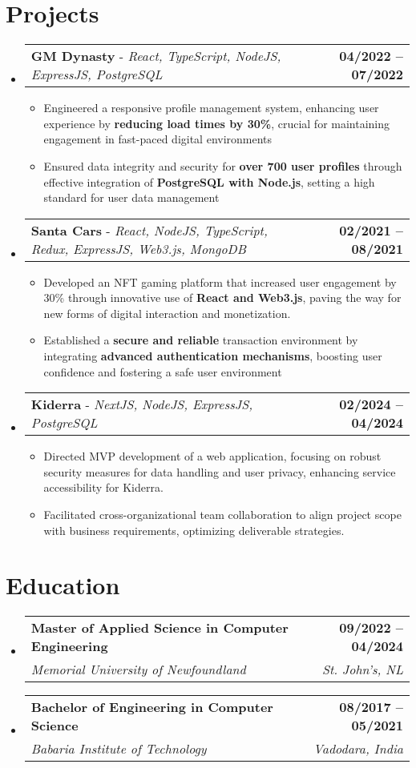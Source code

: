 \documentclass[letterpaper,11pt]{article}
\makeatletter
\newcommand{\resumeItem}[1]{
  \item\small{
    {#1 \vspace{-2pt}}
  }
}
\newcommand{\resumeSubheading}[4]{
  \vspace{-2pt}\item
    \begin{tabular*}{1.0\textwidth}[t]{l@{\extracolsep{\fill}}r}
      \textbf{#1} & \textbf{\small #2} \\
      \textit{\small#3} & \textit{\small #4} \\
    \end{tabular*}\vspace{-7pt}
}
\newcommand{\resumeProjectHeading}[2]{
    \item
    \begin{tabular*}{1.001\textwidth}{l@{\extracolsep{\fill}}r}
      \small#1 & \textbf{\small #2}\\
    \end{tabular*}\vspace{-7pt}
}
\newcommand{\resumeSubHeadingListStart}{\begin{itemize}[leftmargin=0.0in, label={}]}
\newcommand{\resumeSubHeadingListEnd}{\end{itemize}}
\newcommand{\resumeItemListStart}{\begin{itemize}}
\newcommand{\resumeItemListEnd}{\end{itemize}\vspace{-5pt}}
\makeatother
\begin{document}
\section{Projects}
  \resumeSubHeadingListStart
    \resumeProjectHeading
        {\textbf{GM Dynasty} - \emph{React, TypeScript, NodeJS, ExpressJS, PostgreSQL}}{04/2022 -- 07/2022}
        \resumeItemListStart
          \resumeItem{Engineered a responsive profile management system, enhancing user experience by \textbf{reducing load times by 30\%}, crucial for maintaining engagement in fast-paced digital environments}
          \resumeItem{Ensured data integrity and security for \textbf{over 700 user profiles} through effective integration of \textbf{PostgreSQL with Node.js}, setting a high standard for user data management}
        \resumeItemListEnd
        \vspace{-16pt}
    \resumeProjectHeading
        {\textbf{Santa Cars} - \emph{React, NodeJS, TypeScript, Redux, ExpressJS, Web3.js, MongoDB}}{02/2021 -- 08/2021}
        \resumeItemListStart
          \resumeItem{Developed an NFT gaming platform that increased user engagement by 30\% through innovative use of \textbf{React and Web3.js}, paving the way for new forms of digital interaction and monetization.}
          \resumeItem{Established a \textbf{secure and reliable} transaction environment by integrating \textbf{advanced authentication mechanisms}, boosting user confidence and fostering a safe user environment}
        \resumeItemListEnd
                \vspace{-16pt}
    \resumeProjectHeading
        {\textbf{Kiderra} - \emph{NextJS, NodeJS, ExpressJS, PostgreSQL}}{02/2024 -- 04/2024}
        \resumeItemListStart
          \resumeItem{Directed MVP development of a web application, focusing on robust security measures for data handling and user privacy, enhancing service accessibility for Kiderra.}
          \resumeItem{Facilitated cross-organizational team collaboration to align project scope with business requirements, optimizing deliverable strategies.}
        \resumeItemListEnd
  \resumeSubHeadingListEnd
\vspace{-15pt}

\section{Education}
\resumeSubHeadingListStart
\resumeSubheading
{Master of Applied Science in Computer Engineering}{09/2022 -- 04/2024}
{Memorial University of Newfoundland}{St. John's, NL}
\resumeSubheading
{Bachelor of Engineering in Computer Science}{08/2017 -- 05/2021}
{Babaria Institute of Technology}{Vadodara, India}
\resumeSubHeadingListEnd
\end{document}
